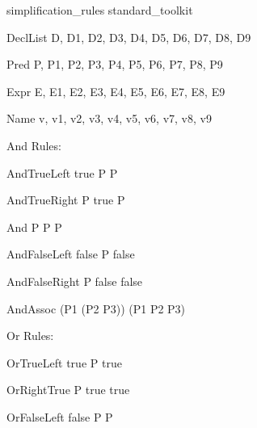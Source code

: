 \begin{zsection}
  \SECTION simplification\_rules \parents standard\_toolkit
\end{zsection}

\begin{zedjoker}{DeclList} D, D1, D2, D3, D4, D5, D6, D7, D8, D9 \end{zedjoker}
\begin{zedjoker}{Pred} P, P1, P2, P3, P4, P5, P6, P7, P8, P9 \end{zedjoker}
\begin{zedjoker}{Expr} E, E1, E2, E3, E4, E5, E6, E7, E8, E9 \end{zedjoker}
\begin{zedjoker}{Name} v, v1, v2, v3, v4, v5, v6, v7, v8, v9 \end{zedjoker}

And Rules:

\begin{zedrule}{AndTrueLeft}
  true \land P \iff P
\end{zedrule}

\begin{zedrule}{AndTrueRight}
  P \land true \iff P
\end{zedrule}

\begin{zedrule}{And}
  P \land P \iff P
\end{zedrule}

\begin{zedrule}{AndFalseLeft}
  false \land P \iff false
\end{zedrule}

\begin{zedrule}{AndFalseRight}
  P \land false \iff false
\end{zedrule}

\begin{zedrule}{AndAssoc}
  (P1 \land (P2 \land P3)) \iff (P1 \land P2 \land P3)
\end{zedrule}

Or Rules:

\begin{zedrule}{OrTrueLeft}
  true \lor P \iff true
\end{zedrule}

\begin{zedrule}{OrRightTrue}
  P \lor true \iff true
\end{zedrule}

\begin{zedrule}{OrFalseLeft}
  false \lor P \iff P
\end{zedrule}

